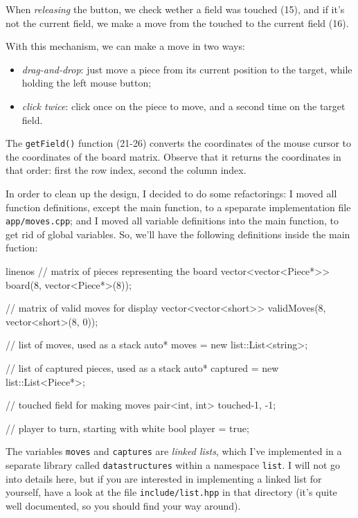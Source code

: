 When \emph{releasing} the button, we check wether a field was touched (15), and if it's not
the current field, we make a move from the touched to the current field (16).

With this mechanism, we can make a move in two ways:
\begin{itemize}
  \item \emph{drag-and-drop}: just move a piece from its current position to the target,
    while holding the left mouse button;
  \item \emph{click twice}: click once on the piece to move, and a second time on the
    target field.
\end{itemize}

The \texttt{getField()} function (21-26) converts the coordinates of the mouse cursor to
the coordinates of the board matrix.
Observe that it returns the coordinates in that order: first the row index, second the
column index.

In order to clean up the design, I decided to do some refactorings: I moved all function definitions,
except the main function, to a speparate implementation file
\texttt{app/moves.cpp}; and I moved all variable definitions into the main function, to get rid of
global variables.
So, we'll have the following definitions inside the main fuction:

\begin{cpp*}{linenos}
// matrix of pieces representing the board
vector<vector<Piece*>> board(8, vector<Piece*>(8));

// matrix of valid moves for display
vector<vector<short>> validMoves(8, vector<short>(8, 0));

// list of moves, used as a stack
auto* moves = new list::List<string>;

// list of captured pieces, used as a stack
auto* captured = new list::List<Piece*>;

// touched field for making moves
pair<int, int> touched{-1, -1};

// player to turn, starting with white
bool player = true;
\end{cpp*}

The variables \texttt{moves} and \texttt{captures} are \emph{linked lists}, which I've implemented
in a separate library called \texttt{datastructures} within a namespace \texttt{list}.
I will not go into details here, but if you are interested in implementing a linked list for yourself,
have a look at the file \texttt{include/list.hpp} in that directory (it's quite well documented,
so you should find your way around).

